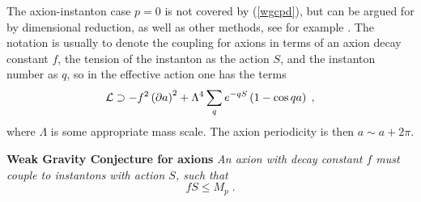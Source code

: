 \documentclass[11pt,a4paper]{article}
\numberwithin{equation}{section}
\numberwithin{table}{section}\setlength{\multlinegap}{25pt}
\newcommand{\be}{\begin{equation}}
\newcommand{\ee}{\end{equation}}
\begin{document}
The axion-instanton case $p=0$ is not covered by (\ref{wgcpd}), but can be argued for by dimensional reduction, as well as other methods, see for example \cite{ArkaniHamed:2006dz,Rudelius:2015xta,Brown:2015iha,Heidenreich:2015wga,Vittmann}. The notation is usually to denote the coupling for axions in terms of an axion decay constant $f$, the tension of the instanton as the action $S$, and the instanton number as $q$, so in the effective action one has the terms
\be
\label{actaxin}
{\cal L} \supset - f^2 \left(\partial a \right)^2 + \Lambda^4 \sum_q e^{-q S}\left( 1 - \cos{q a} \right) \;,
\ee
where $\Lambda$ is some appropriate mass scale. The axion periodicity is then $a \sim a + 2 \pi$. 
\begin{tcolorbox}
{\bf Weak Gravity Conjecture for axions} \;\cite{ArkaniHamed:2006dz}
{\it 
\newline
\newline
An axion with decay constant $f$ must couple to instantons with action $S$, such that  
\be
\label{wgcax}
f S \leq M_p \;.
\ee 
}
\end{tcolorbox}
\end{document}
